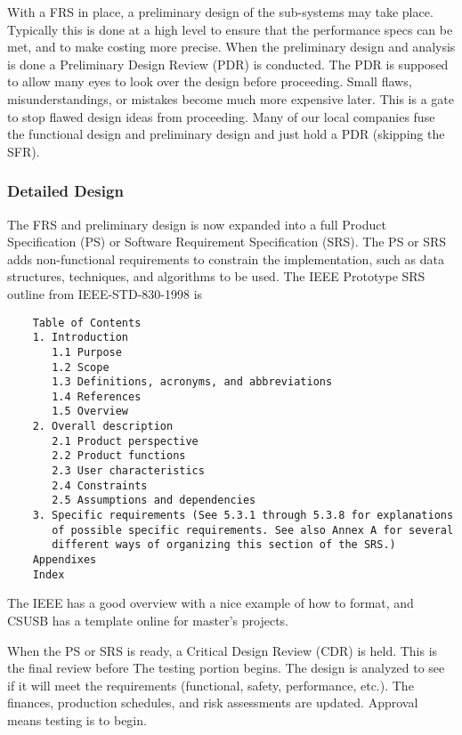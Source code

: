 With a FRS in place, a preliminary design of the sub-systems may take place.  Typically this is done at a high level to ensure that the performance specs can be met, and to make costing more precise.  When the preliminary design and analysis is done a Preliminary Design Review (PDR) is conducted.  The PDR is supposed to allow many eyes to look over the design before proceeding.  Small flaws, misunderstandings, or mistakes become much more expensive later.  This is a gate to stop flawed design ideas from proceeding.  Many of our local companies fuse the functional design and preliminary design and just hold a PDR (skipping the SFR).

\subsubsection{Detailed Design}
The FRS and preliminary design is now expanded into a full Product Specification (PS) or Software Requirement Specification (SRS).  The PS or SRS adds non-functional requirements to constrain the implementation, such as data structures, techniques, and algorithms to be used.  The IEEE Prototype SRS outline from IEEE-STD-830-1998 is
\begin{verbatim}
    Table of Contents
    1. Introduction
       1.1 Purpose
       1.2 Scope
       1.3 Definitions, acronyms, and abbreviations
       1.4 References
       1.5 Overview
    2. Overall description
       2.1 Product perspective
       2.2 Product functions
       2.3 User characteristics
       2.4 Constraints
       2.5 Assumptions and dependencies
    3. Specific requirements (See 5.3.1 through 5.3.8 for explanations
       of possible specific requirements. See also Annex A for several
       different ways of organizing this section of the SRS.)
    Appendixes
    Index
\end{verbatim}
The IEEE has a good overview with a nice example of how to format, and CSUSB has a template online for master's projects.

When the PS or SRS is ready, a Critical Design Review (CDR) is held.  This is the final review before The testing portion begins.  The design is analyzed to see if it will meet the requirements (functional, safety, performance, etc.).  The finances, production schedules, and risk assessments are updated.  Approval means testing is to begin.

